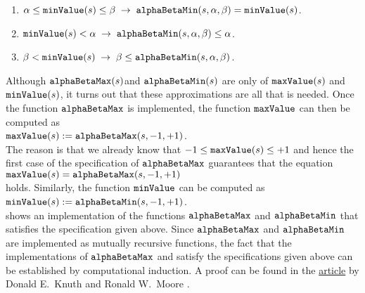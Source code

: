 \begin{enumerate}
\item $\alpha \leq \texttt{minValue}(s) \leq \beta \;\rightarrow\;
         \texttt{alphaBetaMin}(s, \alpha, \beta) = \texttt{minValue}(s)
      $.
\item $\texttt{minValue}(s) < \alpha \;\rightarrow\; \texttt{alphaBetaMin}(s, \alpha, \beta) \leq \alpha$.
\item $\beta < \texttt{minValue}(s) \;\rightarrow\; \beta \leq \texttt{alphaBetaMin}(s, \alpha, \beta)$.
\end{enumerate}
Although $\texttt{alphaBetaMax}(s)$and $\texttt{alphaBetaMin}(s)$  are only  of
$\texttt{maxValue}(s)$ and $\texttt{minValue}(s)$, it turns out that these approximations are all that
is needed.  Once the function $\texttt{alphaBetaMax}$ is implemented, the function
$\texttt{maxValue}$ can then be computed as 
\\[0.2cm]
\hspace*{1.3cm}
$\texttt{maxValue}(s) := \texttt{alphaBetaMax}(s, -1, +1)$.
\\[0.2cm]
The reason is that we already know that $-1 \leq \texttt{maxValue}(s) \leq +1$ and hence the first case of the
specification of $\texttt{alphaBetaMax}$ guarantees that the equation
\\[0.2cm]
\hspace*{1.3cm}
$\texttt{maxValue}(s) = \texttt{alphaBetaMax}(s,-1,+1)$
\\[0.2cm]
holds.  Similarly, the function $\texttt{minValue}$ can be computed as 
\\[0.2cm]
\hspace*{1.3cm}
$\texttt{minValue}(s) := \texttt{alphaBetaMin}(s, -1, +1)$.
\\[0.2cm]
 shows an implementation of the functions $\texttt{alphaBetaMax}$ and
$\texttt{alphaBetaMin}$ that satisfies the specification given above.
Since $\texttt{alphaBetaMax}$ and $\texttt{alphaBetaMin}$ are implemented as mutually recursive functions, 
the fact that the implementations of $\texttt{alphaBetaMax}$ and 
satisfy the specifications given above can be established by computational induction.  A proof 
can be found in the
\href{https://pdfs.semanticscholar.org/dce2/6118156e5bc287bca2465a62e75af39c7e85.pdf}{article} by Donald 
E.~Knuth and Ronald W.~Moore \cite{knuth:1975}. 


